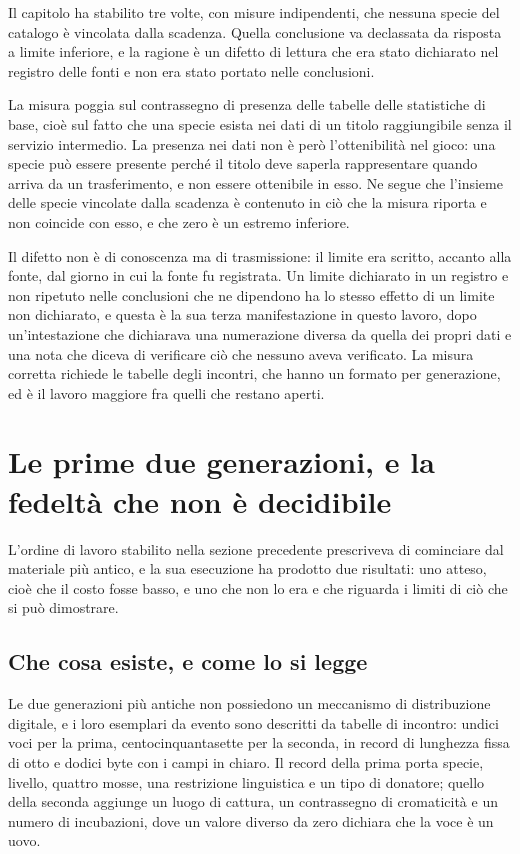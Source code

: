 Il capitolo ha stabilito tre volte, con misure indipendenti, che nessuna specie del catalogo è vincolata dalla scadenza. Quella conclusione va declassata da risposta a limite inferiore, e la ragione è un difetto di lettura che era stato dichiarato nel registro delle fonti e non era stato portato nelle conclusioni.

La misura poggia sul contrassegno di presenza delle tabelle delle statistiche di base, cioè sul fatto che una specie esista nei dati di un titolo raggiungibile senza il servizio intermedio. La presenza nei dati non è però l'ottenibilità nel gioco: una specie può essere presente perché il titolo deve saperla rappresentare quando arriva da un trasferimento, e non essere ottenibile in esso. Ne segue che l'insieme delle specie vincolate dalla scadenza è contenuto in ciò che la misura riporta e non coincide con esso, e che zero è un estremo inferiore.

Il difetto non è di conoscenza ma di trasmissione: il limite era scritto, accanto alla fonte, dal giorno in cui la fonte fu registrata. Un limite dichiarato in un registro e non ripetuto nelle conclusioni che ne dipendono ha lo stesso effetto di un limite non dichiarato, e questa è la sua terza manifestazione in questo lavoro, dopo un'intestazione che dichiarava una numerazione diversa da quella dei propri dati e una nota che diceva di verificare ciò che nessuno aveva verificato. La misura corretta richiede le tabelle degli incontri, che hanno un formato per generazione, ed è il lavoro maggiore fra quelli che restano aperti.
\section{Le prime due generazioni, e la fedeltà che non è decidibile}

L'ordine di lavoro stabilito nella sezione precedente prescriveva di cominciare dal materiale più antico, e la sua esecuzione ha prodotto due risultati: uno atteso, cioè che il costo fosse basso, e uno che non lo era e che riguarda i limiti di ciò che si può dimostrare.

\subsection*{Che cosa esiste, e come lo si legge}

Le due generazioni più antiche non possiedono un meccanismo di distribuzione digitale, e i loro esemplari da evento sono descritti da tabelle di incontro: undici voci per la prima, centocinquantasette per la seconda, in record di lunghezza fissa di otto e dodici byte con i campi in chiaro. Il record della prima porta specie, livello, quattro mosse, una restrizione linguistica e un tipo di donatore; quello della seconda aggiunge un luogo di cattura, un contrassegno di cromaticità e un numero di incubazioni, dove un valore diverso da zero dichiara che la voce è un uovo.

